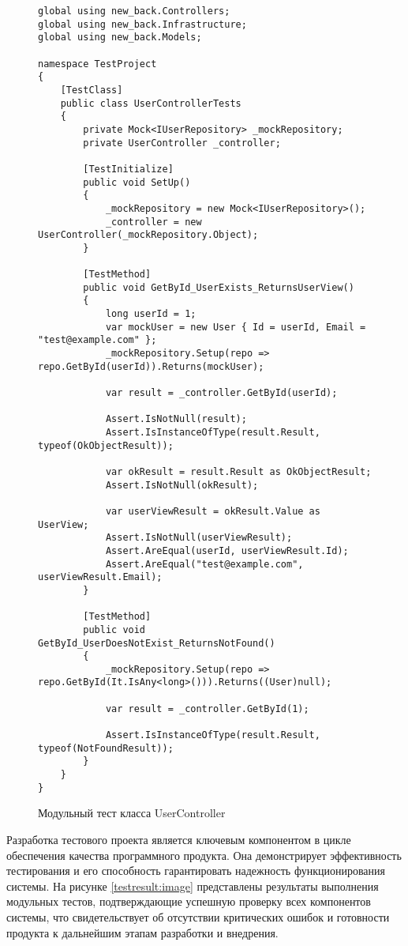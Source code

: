 \begin{figure}[ht]
\lstset{style=sharpc}
\begin{lstlisting}
global using new_back.Controllers;
global using new_back.Infrastructure;
global using new_back.Models;

namespace TestProject
{
    [TestClass]
    public class UserControllerTests
    {
        private Mock<IUserRepository> _mockRepository;
        private UserController _controller;

        [TestInitialize]
        public void SetUp()
        {
            _mockRepository = new Mock<IUserRepository>();
            _controller = new UserController(_mockRepository.Object);
        }

        [TestMethod]
        public void GetById_UserExists_ReturnsUserView()
        {
            long userId = 1;
            var mockUser = new User { Id = userId, Email = "test@example.com" };
            _mockRepository.Setup(repo => repo.GetById(userId)).Returns(mockUser);

            var result = _controller.GetById(userId);

            Assert.IsNotNull(result);
            Assert.IsInstanceOfType(result.Result, typeof(OkObjectResult));

            var okResult = result.Result as OkObjectResult;
            Assert.IsNotNull(okResult);

            var userViewResult = okResult.Value as UserView;
            Assert.IsNotNull(userViewResult);
            Assert.AreEqual(userId, userViewResult.Id);
            Assert.AreEqual("test@example.com", userViewResult.Email);
        }

        [TestMethod]
        public void GetById_UserDoesNotExist_ReturnsNotFound()
        {
            _mockRepository.Setup(repo => repo.GetById(It.IsAny<long>())).Returns((User)null);

            var result = _controller.GetById(1);

            Assert.IsInstanceOfType(result.Result, typeof(NotFoundResult));
        }
    }
}
\end{lstlisting}
\caption{Модульный тест класса UserController}
\label{unitcontr1:image}
\end{figure}

Разработка тестового проекта является ключевым компонентом в цикле обеспечения качества программного продукта. Она демонстрирует эффективность тестирования и его способность гарантировать надежность функционирования системы. На рисунке \ref{testresult:image} представлены результаты выполнения модульных тестов, подтверждающие успешную проверку всех компонентов системы, что свидетельствует об отсутствии критических ошибок и готовности продукта к дальнейшим этапам разработки и внедрения.

